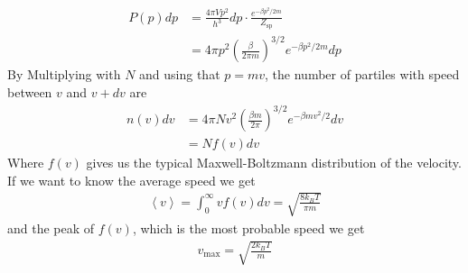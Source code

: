 \begin{align*}
	P(p) dp &= \frac{4\pi Vp^2}{h^3}dp	\cdot \frac{e^{-\beta p^2/2m}}{Z_{\text{sp}}} \\
	&= 4\pi p^2 \left(\frac{\beta}{2 \pi m}\right)^{3/2}e^{-\beta p^2/2m}dp
\end{align*}
By Multiplying with $N$ and using that $p = mv$, the number of partiles with speed between $v$ and $v + dv$ are 
\begin{align*}
	n(v) dv &= 4\pi Nv^2 \left(\frac{\beta m}{2\pi}\right)^{3/2}e^{-\beta mv^2/2}dv\\
					&= Nf(v) dv
\end{align*}
Where $f(v)$ gives us the typical Maxwell-Boltzmann distribution of the velocity.\\
If we want to know the average speed we get
\begin{align*}
	\left<v\right> = \int_{0}^{\infty}vf(v) dv = \sqrt{\frac{8k_B T}{\pi m}}
\end{align*}
and the peak of $f(v)$, which is the most probable speed we get
\begin{align*}
	v_{\text{max}} = \sqrt{\frac{2 k_B T}{m}}
\end{align*}
